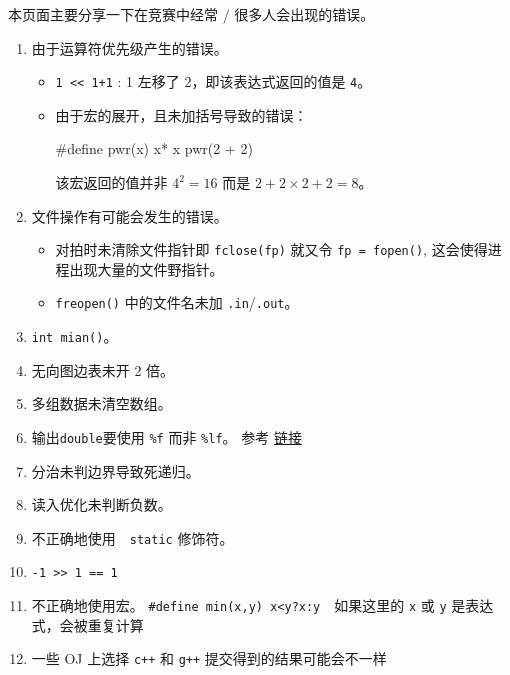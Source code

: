 
本页面主要分享一下在竞赛中经常 / 很多人会出现的错误。

\begin{enumerate}
\item 由于运算符优先级产生的错误。
\begin{itemize}
\item \texttt{1 << 1+1} : 1 左移了 2，即该表达式返回的值是 \texttt{4}。
\item 由于宏的展开，且未加括号导致的错误：
\begin{cppcode}
#define pwr(x) x* x
pwr(2 + 2)
\end{cppcode}
该宏返回的值并非 $4^2 = 16$ 而是 $2+2\times 2+2 = 8$。
\end{itemize}
\item 文件操作有可能会发生的错误。
\begin{itemize}
\item 对拍时未清除文件指针即 \texttt{fclose(fp)} 就又令 \texttt{fp = fopen()}, 这会使得进程出现大量的文件野指针。
\item \texttt{freopen()} 中的文件名未加 \texttt{.in}/\texttt{.out}。
\end{itemize}
\item \texttt{int mian()}。
\item 无向图边表未开 2 倍。
\item 多组数据未清空数组。
\item 输出\texttt{double}要使用 \texttt{\%f} 而非 \texttt{\%lf}。 参考 \href{https://stackoverflow.com/questions/4264127/correct-format-specifier-for-double-in-printf}{链接}
\item 分治未判边界导致死递归。
\item 读入优化未判断负数。
\item 不正确地使用　\texttt{static} 修饰符。
\item \texttt{-1 >> 1 == 1}
\item 不正确地使用宏。
\texttt{\#define min(x,y) x<y?x:y}　如果这里的 \texttt{x} 或 \texttt{y} 是表达式，会被重复计算
\item 一些 OJ 上选择 \texttt{c++} 和 \texttt{g++} 提交得到的结果可能会不一样
\end{enumerate}
